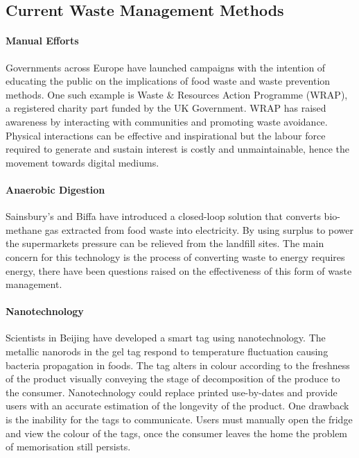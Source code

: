 \documentclass[a4paper, 11pt]{article}
\begin{document}
\vspace{\baselineskip}
\vspace{\baselineskip}
\vspace{\baselineskip}

\subsection{Current Waste Management Methods}

\paragraph{Manual Efforts}
Governments across Europe have launched campaigns with the intention of educating the public on the implications of food waste and waste prevention methods. One such example is Waste \& Resources Action Programme (WRAP), a registered charity part funded by the UK Government. WRAP has raised awareness by interacting with communities and promoting waste avoidance. Physical interactions can be effective and inspirational but the labour force required to generate and sustain interest is costly and unmaintainable, hence the movement towards digital mediums.\cite{FoodWaste}

\paragraph{Anaerobic Digestion}
Sainsbury's and Biffa have introduced a closed-loop solution that converts bio-methane gas extracted from food waste into electricity. By using surplus to power the supermarkets pressure can be relieved from the landfill sites. The main concern for this technology is the process of converting waste to energy requires energy, there have been questions raised on the effectiveness of this form of waste management.\cite{anarobic} 

\paragraph{Nanotechnology}
Scientists in Beijing have developed a smart tag using nanotechnology. The metallic nanorods in the gel tag respond to temperature fluctuation causing bacteria propagation in foods. The tag alters in colour according to the freshness of the product visually conveying the stage of decomposition of the produce to the consumer. Nanotechnology could replace printed use-by-dates and provide users with an accurate estimation of the longevity of the product. One drawback is the inability for the tags to communicate. Users must manually open the fridge and view the colour of the tags, once the consumer leaves the home the problem of memorisation still persists.\cite{FoodWaste}
\end{document}
